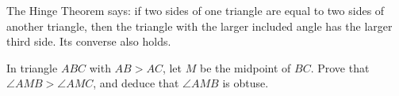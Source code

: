 The Hinge Theorem says: if two sides of one triangle are equal to two sides of another triangle, then the triangle with the larger included angle has the larger third side. Its converse also holds.

In triangle $ABC$ with $AB>AC$, let $M$ be the midpoint of $BC$. Prove that $\angle AMB>\angle AMC$, and deduce that $\angle AMB$ is obtuse.
